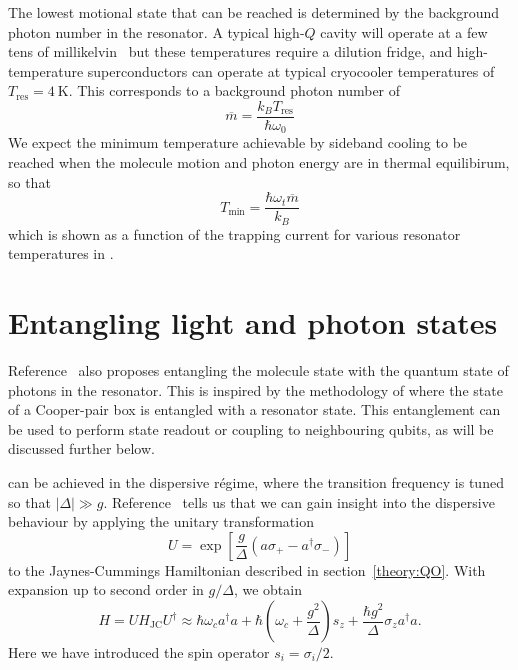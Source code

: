 The lowest motional state that can be reached is determined by the background
photon number in the resonator. A typical high-$Q$ cavity will operate at a few
tens of millikelvin~\cite{doi:10.1063/1.3010859} but these temperatures require
a dilution fridge, and high-temperature superconductors can operate at typical
cryocooler temperatures of $T_\text{res}=\SI{4}{\kelvin}$. This corresponds
to a background photon number of
%
\begin{equation}
  \overline{m} = \frac{k_B T_\text{res}}{\hbar \omega_0}
\end{equation}
%
We expect the minimum temperature achievable by sideband cooling to be reached
when the molecule motion and photon energy are in thermal equilibirum, so that
%
\begin{equation}
  T_\text{min} = \frac{\hbar \omega_t \overline{m}}{k_B}
\end{equation}
%
which is shown as a function of the trapping current for various resonator
temperatures in . 

\section{Entangling light and photon states}

Reference~\cite{Andre2008} also proposes entangling the molecule state with the
quantum state of photons in the resonator. This is inspired by the methodology
of  where the state of a Cooper-pair box is
entangled with a resonator state. This entanglement can be used to perform
state readout or coupling to neighbouring qubits, as will be discussed further
below.


 can be achieved in the dispersive r\'egime, where the transition
frequency is tuned so that $|\Delta|\gg g$. 
Reference~\cite{PhysRevA.69.062320} tells us that we can gain insight into the
dispersive behaviour by applying the unitary transformation
%
\begin{equation} U = \exp \left[\frac{g}{\Delta}(a\sigma_+ -
a^\dagger\sigma_-)\right] \end{equation}
%
to the Jaynes-Cummings Hamiltonian described in section~\ref{theory:QO}. With
expansion up to second order in $g/\Delta$, we obtain
%
\begin{equation} H= UH_\text{JC}U^\dagger \approx \hbar \omega_c
  a^\dagger a + \hbar\left(\omega_c +
  \frac{g^2}{\Delta}\right)s_z + \frac{\hbar
  g^2}{\Delta}\sigma_z a^\dagger a.
\end{equation}
%
Here we have introduced the spin operator $s_i = \sigma_i/2$.

